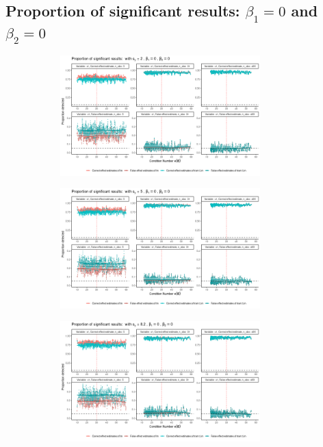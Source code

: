 \documentclass[11pt,a4paper,twoside]{book}\usepackage[]{graphicx}\usepackage[]{xcolor}
\begin{document}
\subsection{Proportion of significant results: $\beta_1=0$ and $\beta_2=0$}
\begin{figure}[H]
\begin{subfigure}[b]{1\textwidth}
\vspace*{-0.5cm}
\centering
\includegraphics[width=0.85\textwidth]{../fromsim/simres_prop101-1.png}
\end{subfigure}
\begin{subfigure}[b]{1\textwidth}
\vspace*{-0.9cm}
\centering
\includegraphics[width=0.85\textwidth]{../fromsim/simres_prop111-1.png}
\end{subfigure}
\begin{subfigure}[b]{1\textwidth}
\vspace*{-0.9cm}
\centering
\includegraphics[width=0.85\textwidth]{../fromsim/simres_prop121-1.png}

\end{subfigure}
\end{figure}
\end{document}
